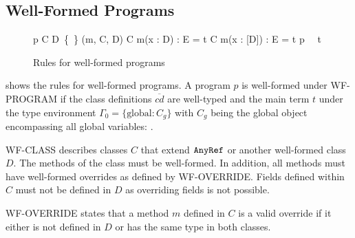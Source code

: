 \subsection{Well-Formed Programs}
\begin{figure}
    {p \vdash {} C  D\ \{\ \}}
\vspace{3mm}
    {(m, C, D)}
\vspace{3mm}
    {C \vdash {} m(x : D) : E = t}
\vspace{3mm}
    {C \vdash {} m(x : [D]) : E = t}
\vspace{3mm}
    {p \vdash {}\ \ t}

    \caption{Rules for well-formed programs}
    \label{fig:wellformed-programs}
\end{figure}

 shows the rules for well-formed programs. A program $p$ is well-formed under WF-PROGRAM if the class definitions $\overline{cd}$ are well-typed and the main term $t$ under the type environment $\Gamma_0 = \{ \text{global} : C_g \}$ with $C_g$ being the global object encompassing all global variables: .

WF-CLASS describes classes $C$ that extend $\texttt{AnyRef}$ or another well-formed class $D$. The methods of the class must be well-formed. In addition, all methods must have well-formed overrides as defined by WF-OVERRIDE. Fields defined within $C$ must not be defined in $D$ as overriding fields is not possible.

WF-OVERRIDE states that a method $m$ defined in $C$ is a valid override if it either is not defined in $D$ or has the same type in both classes.


